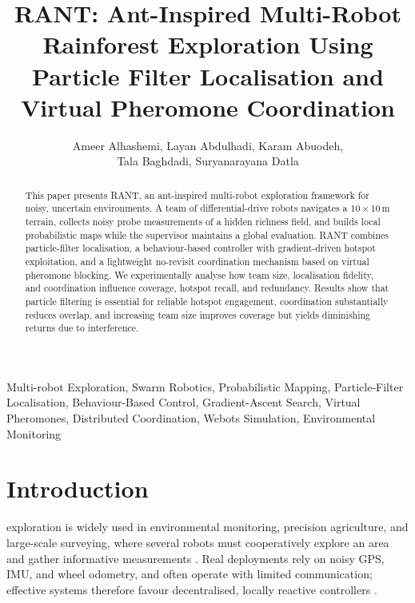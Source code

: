 \documentclass[lettersize,journal]{IEEEtran}
\begin{document}
\title{RANT: Ant-Inspired Multi-Robot Rainforest Exploration Using Particle Filter Localisation and Virtual Pheromone Coordination}

\author{
    Ameer Alhashemi, Layan Abdulhadi, Karam Abuodeh,\\
    Tala Baghdadi, Suryanarayana Datla\\[6pt]
}



\maketitle
\begin{abstract}
This paper presents RANT, an ant-inspired multi-robot exploration framework for noisy, uncertain environments. A team of differential-drive robots navigates a $10\times10$\,m terrain, collects noisy probe measurements of a hidden richness field, and builds local probabilistic maps while the supervisor maintains a global evaluation. RANT combines particle-filter localisation, a behaviour-based controller with gradient-driven hotspot exploitation, and a lightweight no-revisit coordination mechanism based on virtual pheromone blocking. We experimentally analyse how team size, localisation fidelity, and coordination influence coverage, hotspot recall, and redundancy. Results show that particle filtering is essential for reliable hotspot engagement, coordination substantially reduces overlap, and increasing team size improves coverage but yields diminishing returns due to interference.
\end{abstract}

\begin{IEEEkeywords}
Multi-robot Exploration, Swarm Robotics, Probabilistic Mapping, Particle-Filter Localisation, Behaviour-Based Control, Gradient-Ascent Search, Virtual Pheromones, Distributed Coordination, Webots Simulation, Environmental Monitoring
\end{IEEEkeywords}

\section{Introduction}
 exploration is widely used in environmental monitoring, precision agriculture, and large-scale surveying, where several robots must cooperatively explore an area and gather informative measurements \cite{ref1}. Real deployments rely on noisy GPS, IMU, and wheel odometry, and often operate with limited communication; effective systems therefore favour decentralised, locally reactive controllers \cite{ref1,ref6}.
\end{document}
